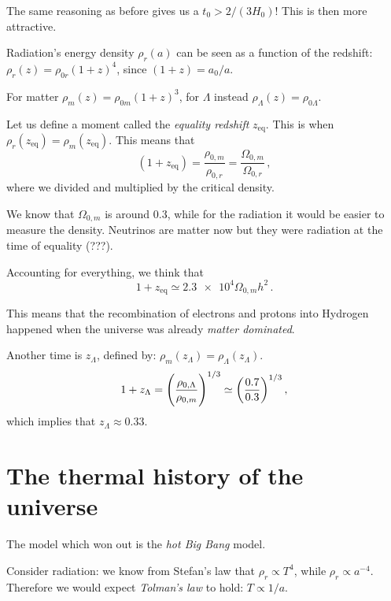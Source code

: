 \documentclass[main.tex]{subfiles}
\begin{document}
The same reasoning as before gives us a \(t_0 > 2 / (3 H_0 )\)! This is then more attractive.

Radiation's energy density \(\rho _r (a)\) can be seen as a function of the redshift: \(\rho _r (z ) = \rho _{0r} (1+z)^{4}\), since \((1+z) = a_0 / a\).

For matter \(\rho _m (z) = \rho_{0m} (1+z)^{3}\), for \(\Lambda \) instead \(\rho _\Lambda (z) = \rho _{0 \Lambda }\).

Let us define a moment called the \emph{equality redshift} \(z _{\text{eq}}\). This is when \(\rho _r (z _{\text{eq}}) = \rho _m (z _{\text{eq}})\). This means that 
%
\begin{equation}
  (1+z _{\text{eq}}) = \frac{\rho _{0,m}}{\rho _{0,r}} 
  = \frac{\Omega_{0,m}}{\Omega_{0,r}}
\,,
\end{equation}
%
where we divided and multiplied by the critical density.

We know that \(\Omega_{0,m}\) is around \num{0.3}, while for the radiation it would be easier to measure the density.
Neutrinos are matter now but they were radiation at the time of equality (???).

Accounting for everything, we think that 
%
\begin{equation}
  1 + z _{\text{eq}} \simeq \num{2.3e4} \Omega_{0, m} h^2
\,.
\end{equation}

This means that the recombination of electrons and protons into Hydrogen happened when the universe was already \emph{matter dominated}.

Another time is \(z_\Lambda \), defined by: \(\rho _m (z_{\Lambda }) = \rho _\Lambda (z_\Lambda )\). 
%
\begin{equation}
  1+ z_\Lambda = \qty(\frac{\rho_{0, \Lambda }}{\rho_{0,m}})^{1/3} \simeq \qty(\frac{0.7}{0.3})^{1/3}
\,,
\end{equation}
%
which implies that \(z_\Lambda \approx \num{0.33}\).

\section{The thermal history of the universe}

The model which won out is the \emph{hot Big Bang} model.

Consider radiation: we know from Stefan's law that \(\rho _r \propto T^{4}\), while \(\rho _r \propto a^{-4}\). Therefore we would expect \emph{Tolman's law} to hold: \(T \propto 1/a\).
\end{document}
